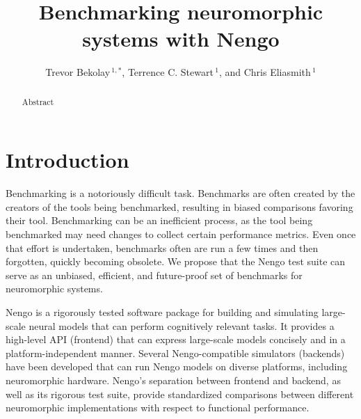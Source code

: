 \documentclass{frontiersSCNS}
\def\keyFont{\fontsize{8}{11}\helveticabold }
\def\firstAuthorLast{Bekolay {et~al.}}
\def\Authors{Trevor Bekolay\,$^{1,*}$,
  Terrence C. Stewart\,$^{1}$, and
  Chris Eliasmith\,$^1$}
\begin{document}
\onecolumn
{}

\title[Benchmarking neuromorphic systems with Nengo]{Benchmarking neuromorphic systems with Nengo}
\author[\firstAuthorLast ]{\Authors}
\address{}
\correspondance{}
\extraAuth{}

\maketitle

\begin{abstract}

  Abstract

  \tiny
  \keyFont{ \section{Keywords:}  }
\end{abstract}

\section{Introduction}

Benchmarking is a notoriously difficult task.
Benchmarks are often created by
the creators of the tools being benchmarked,
resulting in biased comparisons favoring their tool.
Benchmarking can be an inefficient process,
as the tool being benchmarked
may need changes to collect
certain performance metrics.
Even once that effort is undertaken,
benchmarks often are run a few times
and then forgotten,
quickly becoming obsolete.
We propose that the Nengo test suite
can serve as an unbiased, efficient, and future-proof
set of benchmarks for neuromorphic systems.

Nengo is a rigorously tested software package
for building and simulating
large-scale neural models
that can perform cognitively relevant tasks.
It provides a high-level API (frontend)
that can express large-scale models concisely
and in a platform-independent manner.
Several Nengo-compatible simulators (backends)
have been developed that can
run Nengo models on diverse platforms,
including neuromorphic hardware.
Nengo's separation between frontend and backend,
as well as its rigorous test suite,
provide standardized comparisons
between different neuromorphic implementations
with respect to functional performance.
\end{document}
